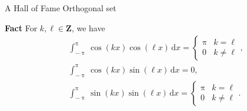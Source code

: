 \documentclass[portrait,fleqn,12pt]{beamer}
\newcommand{\integers}{\mathbf{Z}}
\begin{document}
\begin{frame}{A Hall of Fame Orthogonal set}

\textbf{Fact} For $k, \ell \in \integers$, we have
\begin{align*}
&\int_{-\uppi}^\uppi \cos(k x) \cos(\ell x) \, \mathrm{d} x = \begin{cases} \uppi & k = \ell \\ 0  & k \neq  \ell \end{cases},\\
&\int_{-\uppi}^\uppi \cos(k x) \sin(\ell x) \, \mathrm{d} x = 0, \\
&\int_{-\uppi}^\uppi \sin(k x) \sin(\ell x) \, \mathrm{d} x = \begin{cases} \uppi & k = \ell \\ 0  & k \neq  \ell \end{cases}.
\end{align*}


\end{frame}
\end{document}
